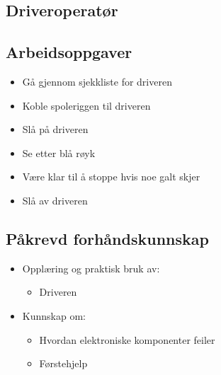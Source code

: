 \subsection{Driveroperatør}

\subsection*{Arbeidsoppgaver}
\begin{itemize}
\item{Gå gjennom sjekkliste for driveren}
\item{Koble spoleriggen til driveren}
\item{Slå på driveren}
\item{Se etter blå røyk}
\item{Være klar til å stoppe hvis noe galt skjer}
\item{Slå av driveren}
\end{itemize}


\subsection*{Påkrevd forhåndskunnskap}
\begin{itemize}
\item{Opplæring og praktisk bruk av:}
\begin{itemize}
\iftoggle{INTERN}{
    \item{Hansken}
}{
}
\item{Driveren}
\end{itemize}
\item{Kunnskap om:}
\begin{itemize}
\item{Hvordan elektroniske komponenter feiler}
\item{Førstehjelp}
\end{itemize}
\end{itemize}
